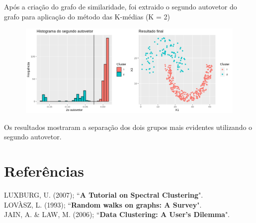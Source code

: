 \documentclass[]{article}
\begin{document}
Após a criação do grafo de similaridade, foi extraido o segundo autovetor do grafo para aplicação do método das K-médias (K = 2)

\newpage

\vspace{1cm}
\begin{figure}[h!]
\includegraphics[width=13cm, height = 4.5cm]{final}
\end{figure}

\vspace{0.5cm}

Os resultados mostraram a separação dos dois grupos mais evidentes utilizando o segundo autovetor.


\newpage

\section{Referências}

\vspace{0.2cm}

\hspace{0.37cm} LUXBURG, U. (2007); “\textbf{A Tutorial on Spectral Clustering}".\\

LOVÀSZ, L. (1993); “\textbf{Random walks on graphs: A Survey}".\\

JAIN, A. \& LAW, M. (2006); “\textbf{Data Clustering: A User’s Dilemma}".\\
\end{document}
